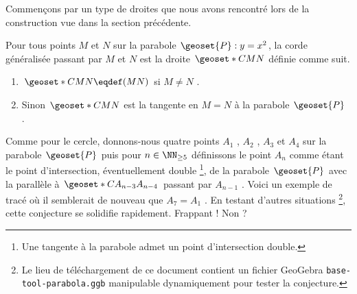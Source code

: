 Commençons par un type de droites que nous avons rencontré lors de la construction vue dans la section précédente. 

\begin{definition}
	Pour tous points $M$  et $N$ sur la parabole $\geoset{P}: y = x^2$, la corde généralisée passant par $M$ et $N$ est la droite $\geoset*{C}{MN}$ définie comme suit.
	\begin{enumerate}
		\item $\geoset*{C}{MN} \eqdef (MN)$ si $M \neq N$ .

		\item Sinon $\geoset*{C}{MN}$ est la tangente en $M = N$ à la parabole $\geoset{P}$ .
	\end{enumerate}
\end{definition}


\medskip

Comme pour le cercle, donnons-nous quatre points $A_1$ , $A_2$ , $A_3$ et $A_4$ sur la parabole $\geoset{P}$ puis pour $n \in \NN_{\geq 5}$ définissons le point $A_n$ comme étant le point d'intersection, éventuellement double
\footnote{
	Une tangente à la parabole admet un point d'intersection double.
},
de la parabole $\geoset{P}$ avec la parallèle à $\geoset*{C}{A_{n-3} A_{n-4}}$ passant par $A_{n-1}$ .
Voici un exemple de tracé où il semblerait de nouveau que $A_7 = A_1$ . En testant d'autres situations
\footnote{
	Le lieu de téléchargement de ce document contient un fichier GeoGebra \texttt{base-tool-parabola.ggb} manipulable dynamiquement pour tester la conjecture.
},
cette conjecture se solidifie rapidement. Frappant ! Non ?
 

\vspace{1em}

\begin{center}
\end{center}

